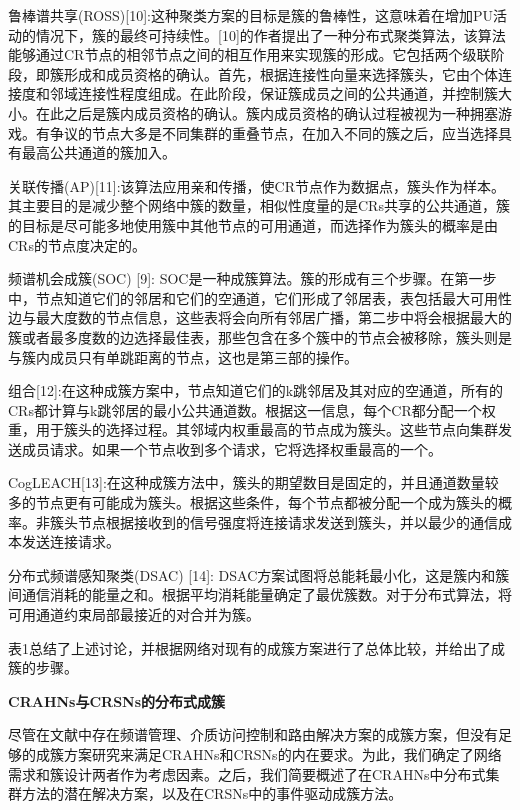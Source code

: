 \documentclass[a4paper,AutoFakeBold,oneside,12pt]{book}
\begin{document}
  鲁棒谱共享(ROSS)[10]:这种聚类方案的目标是簇的鲁棒性，这意味着在增加PU活动的情况下，簇的最终可持续性。[10]的作者提出了一种分布式聚类算法，该算法能够通过CR节点的相邻节点之间的相互作用来实现簇的形成。它包括两个级联阶段，即簇形成和成员资格的确认。首先，根据连接性向量来选择簇头，它由个体连接度和邻域连接性程度组成。在此阶段，保证簇成员之间的公共通道，并控制簇大小。在此之后是簇内成员资格的确认。簇内成员资格的确认过程被视为一种拥塞游戏。有争议的节点大多是不同集群的重叠节点，在加入不同的簇之后，应当选择具有最高公共通道的簇加入。

  关联传播(AP)[11]:该算法应用亲和传播，使CR节点作为数据点，簇头作为样本。其主要目的是减少整个网络中簇的数量，相似性度量的是CRs共享的公共通道，簇的目标是尽可能多地使用簇中其他节点的可用通道，而选择作为簇头的概率是由CRs的节点度决定的。

  频谱机会成簇(SOC) [9]: SOC是一种成簇算法。簇的形成有三个步骤。在第一步中，节点知道它们的邻居和它们的空通道，它们形成了邻居表，表包括最大可用性边与最大度数的节点信息，这些表将会向所有邻居广播，第二步中将会根据最大的簇或者最多度数的边选择最佳表，那些包含在多个簇中的节点会被移除，簇头则是与簇内成员只有单跳距离的节点，这也是第三部的操作。

  组合[12]:在这种成簇方案中，节点知道它们的k跳邻居及其对应的空通道，所有的CRs都计算与k跳邻居的最小公共通道数。根据这一信息，每个CR都分配一个权重，用于簇头的选择过程。其邻域内权重最高的节点成为簇头。这些节点向集群发送成员请求。如果一个节点收到多个请求，它将选择权重最高的一个。

  CogLEACH[13]:在这种成簇方法中，簇头的期望数目是固定的，并且通道数量较多的节点更有可能成为簇头。根据这些条件，每个节点都被分配一个成为簇头的概率。非簇头节点根据接收到的信号强度将连接请求发送到簇头，并以最少的通信成本发送连接请求。

  分布式频谱感知聚类(DSAC) [14]: DSAC方案试图将总能耗最小化，这是簇内和簇间通信消耗的能量之和。根据平均消耗能量确定了最优簇数。对于分布式算法，将可用通道约束局部最接近的对合并为簇。

  表1总结了上述讨论，并根据网络对现有的成簇方案进行了总体比较，并给出了成簇的步骤。

\begin{center}
\textbf{CRAHNs与CRSNs的分布式成簇}
\end{center}

  尽管在文献中存在频谱管理、介质访问控制和路由解决方案的成簇方案，但没有足够的成簇方案研究来满足CRAHNs和CRSNs的内在要求。为此，我们确定了网络需求和簇设计两者作为考虑因素。之后，我们简要概述了在CRAHNs中分布式集群方法的潜在解决方案，以及在CRSNs中的事件驱动成簇方法。
\end{document}
